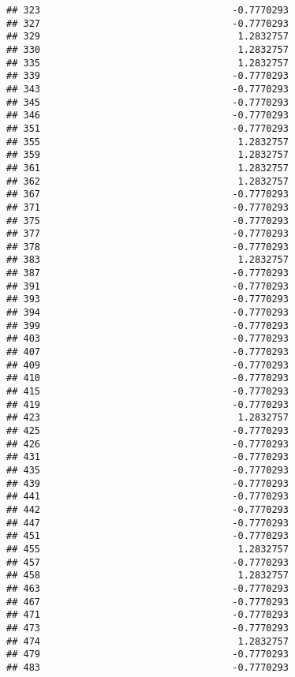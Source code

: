 \documentclass[
]{article}
\begin{document}
\begin{verbatim}
## 323                                  -0.7770293
## 327                                  -0.7770293
## 329                                   1.2832757
## 330                                   1.2832757
## 335                                   1.2832757
## 339                                  -0.7770293
## 343                                  -0.7770293
## 345                                  -0.7770293
## 346                                  -0.7770293
## 351                                  -0.7770293
## 355                                   1.2832757
## 359                                   1.2832757
## 361                                   1.2832757
## 362                                   1.2832757
## 367                                  -0.7770293
## 371                                  -0.7770293
## 375                                  -0.7770293
## 377                                  -0.7770293
## 378                                  -0.7770293
## 383                                   1.2832757
## 387                                  -0.7770293
## 391                                  -0.7770293
## 393                                  -0.7770293
## 394                                  -0.7770293
## 399                                  -0.7770293
## 403                                  -0.7770293
## 407                                  -0.7770293
## 409                                  -0.7770293
## 410                                  -0.7770293
## 415                                  -0.7770293
## 419                                  -0.7770293
## 423                                   1.2832757
## 425                                  -0.7770293
## 426                                  -0.7770293
## 431                                  -0.7770293
## 435                                  -0.7770293
## 439                                  -0.7770293
## 441                                  -0.7770293
## 442                                  -0.7770293
## 447                                  -0.7770293
## 451                                  -0.7770293
## 455                                   1.2832757
## 457                                  -0.7770293
## 458                                   1.2832757
## 463                                  -0.7770293
## 467                                  -0.7770293
## 471                                  -0.7770293
## 473                                  -0.7770293
## 474                                   1.2832757
## 479                                  -0.7770293
## 483                                  -0.7770293

\end{verbatim}
\end{document}
